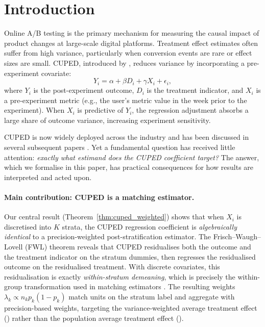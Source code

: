 \documentclass[12pt]{article}
\theoremstyle{plain}
\theoremstyle{definition}
\newcommand{\PATE}{\text{PATE}}
\newcommand{\VWATT}{\text{VWATT}}
\begin{document}
\section{Introduction}
\label{sec:intro}

Online A/B testing is the primary mechanism for measuring the causal impact of
product changes at large-scale digital platforms.
Treatment effect estimates often suffer from high variance, particularly when
conversion events are rare or effect sizes are small.
CUPED, introduced by \citet{deng2013improving}, reduces variance by
incorporating a pre-experiment covariate:
\begin{equation}
  Y_i = \alpha + \beta D_i + \gamma X_i + \epsilon_i,
  \label{eq:cuped}
\end{equation}
where $Y_i$ is the post-experiment outcome, $D_i$ is the treatment indicator,
and $X_i$ is a pre-experiment metric (e.g., the user's metric value in the
week prior to the experiment).
When $X_i$ is predictive of $Y_i$, the regression adjustment absorbs a large
share of outcome variance, increasing experiment sensitivity.

CUPED is now widely deployed across the industry and has been discussed in
several subsequent papers
\citep{deng2013improving, deng2017ratio, poyarkov2016boosted}.
Yet a fundamental question has received little attention: \emph{exactly what
estimand does the CUPED coefficient target?}
The answer, which we formalise in this paper, has practical consequences for
how results are interpreted and acted upon.

\paragraph{Main contribution: CUPED is a matching estimator.}
Our central result (Theorem~\ref{thm:cuped_weighted}) shows that when $X_i$
is discretised into $K$ strata, the CUPED regression coefficient is
\emph{algebraically identical} to a precision-weighted post-stratification
estimator.
The Frisch--Waugh--Lovell (FWL) theorem reveals that CUPED residualises both
the outcome and the treatment indicator on the stratum dummies, then regresses
the residualised outcome on the residualised treatment.
With discrete covariates, this residualisation is exactly \emph{within-stratum
demeaning}, which is precisely the within-group transformation used in
matching estimators \citep{angrist2009mostly}.
The resulting weights $\lambda_k \propto n_k p_k(1-p_k)$ match units on the
stratum label and aggregate with precision-based weights, targeting the
variance-weighted average treatment effect (\VWATT) rather than the population
average treatment effect (\PATE).
\end{document}
